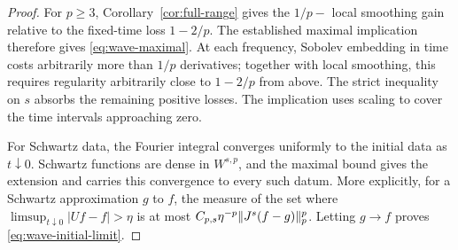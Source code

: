 \begin{proof}
For $p\ge3$, Corollary~\ref{cor:full-range} gives the $1/p-$
local smoothing gain relative to the fixed-time loss $1-2/p$.
The established maximal implication
\cite[Section~3.5, Equation~(3.24)]{BeltranHickmanSogge2019Survey}
therefore gives \eqref{eq:wave-maximal}. At each frequency, Sobolev
embedding in time costs arbitrarily more than $1/p$ derivatives;
together with local smoothing, this requires regularity arbitrarily
close to $1-2/p$ from above. The strict inequality on $s$ absorbs
the remaining positive losses. The implication uses scaling to cover
the time intervals approaching zero.

For Schwartz data, the Fourier integral converges uniformly to the
initial data as $t\downarrow0$. Schwartz functions are dense in
$W^{s,p}$, and the maximal bound gives the extension and carries this
convergence to every such datum. More explicitly, for a Schwartz
approximation $g$ to $f$, the measure of the set where
$\limsup_{t\downarrow0}|Uf-f|>\eta$ is at most
$C_{p,s}\eta^{-p}\lVert J^s(f-g)\rVert_p^p$. Letting $g\to f$ proves
\eqref{eq:wave-initial-limit}.
\end{proof}
